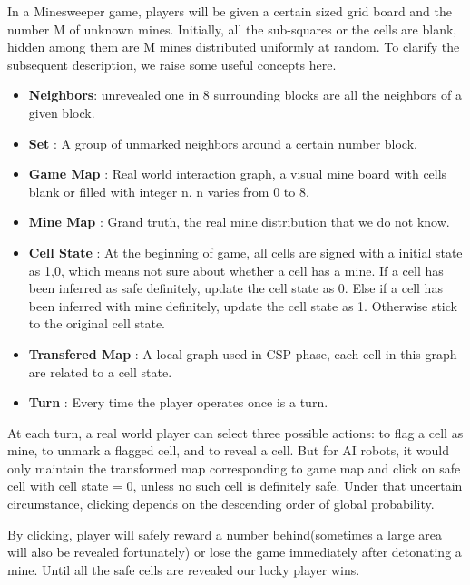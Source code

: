 \documentclass[10pt,twocolumn,letterpaper]{article}
\begin{document}
In a Minesweeper game, players will be given a certain sized grid board and the number M of unknown mines.  Initially, all the sub-squares or the cells are blank, hidden among them are M mines distributed uniformly at random.  To clarify the subsequent description, we raise some useful concepts here.
	\begin{itemize}
		\item \textbf{Neighbors}: unrevealed one in 8 surrounding blocks are all the neighbors of a given block.
		\item \textbf{Set} : A group of unmarked neighbors around a certain number block.
		\item \textbf{Game Map} : Real world interaction graph, a visual mine board with cells blank or filled with integer n. n varies from 0 to 8.
		\item \textbf{Mine Map} : Grand truth, the real mine distribution that we do not know.
		\item \textbf{Cell State} : At the beginning of game, all cells are signed with a initial state as {1,0}, which means not sure about whether a cell has a mine. If a cell has been inferred as safe definitely, update the cell state as {0}. Else if a cell has been inferred with mine definitely, update the cell state as {1}. Otherwise stick to the original cell state.
		\item \textbf{Transfered Map} : A local graph used in CSP phase, each cell in this graph are related to a cell state.
		\item \textbf{Turn} : Every time the player operates once is a turn.
	\end{itemize}
	
At each turn, a real world player can select three possible actions: to flag a cell as mine, to unmark a flagged cell, and to reveal a cell. But for AI robots, it would only maintain the transformed map corresponding to game map and click on safe cell with cell state = {0}, unless no such cell is definitely safe. Under that uncertain circumstance, clicking depends on the descending order of global probability.

By clicking, player will safely reward a number behind(sometimes a large area will also be revealed fortunately) or lose the game immediately after detonating a mine. Until all the safe cells are revealed our lucky player wins. 
\end{document}
